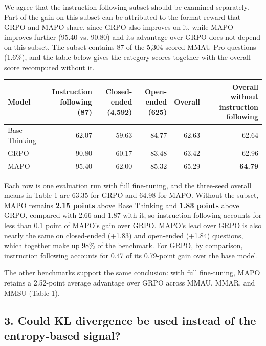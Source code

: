 We agree that the instruction-following subset should be examined separately. Part of the gain on this subset can be attributed to the format reward that GRPO and MAPO share, since GRPO also improves on it, while MAPO improves further (95.40 vs. 90.80) and its advantage over GRPO does not depend on this subset. The subset contains 87 of the 5,304 scored MMAU-Pro questions (1.6\%), and the table below gives the category scores together with the overall score recomputed without it.

\par\medskip
\begingroup
\small
\setlength{\tabcolsep}{5pt}
\renewcommand{\arraystretch}{1.2}
\noindent\begin{tabularx}{\linewidth}{@{}LRRRRR@{}}
\toprule
\textbf{Model} & \textbf{Instruction following (87)} & \textbf{Closed-ended (4,592)} & \textbf{Open-ended (625)} & \textbf{Overall} & \textbf{Overall without instruction following} \\
\midrule
Base Thinking & 62.07 & 59.63 & 84.77 & 62.63 & 62.64 \\
GRPO & 90.80 & 60.17 & 83.48 & 63.42 & 62.96 \\
MAPO & 95.40 & 62.00 & 85.32 & 65.29 & \textbf{64.79} \\
\bottomrule
\end{tabularx}
\par\endgroup\medskip

Each row is one evaluation run with full fine-tuning, and the three-seed overall means in Table 1 are 63.35 for GRPO and 64.98 for MAPO. Without the subset, MAPO remains \textbf{2.15 points} above Base Thinking and \textbf{1.83 points} above GRPO, compared with 2.66 and 1.87 with it, so instruction following accounts for less than 0.1 point of MAPO's gain over GRPO. MAPO's lead over GRPO is also nearly the same on closed-ended (+1.83) and open-ended (+1.84) questions, which together make up 98\% of the benchmark. For GRPO, by comparison, instruction following accounts for 0.47 of its 0.79-point gain over the base model.

The other benchmarks support the same conclusion: with full fine-tuning, MAPO retains a 2.52-point average advantage over GRPO across MMAU, MMAR, and MMSU (Table 1).

\subsection*{3. Could KL divergence be used instead of the entropy-based signal?}

